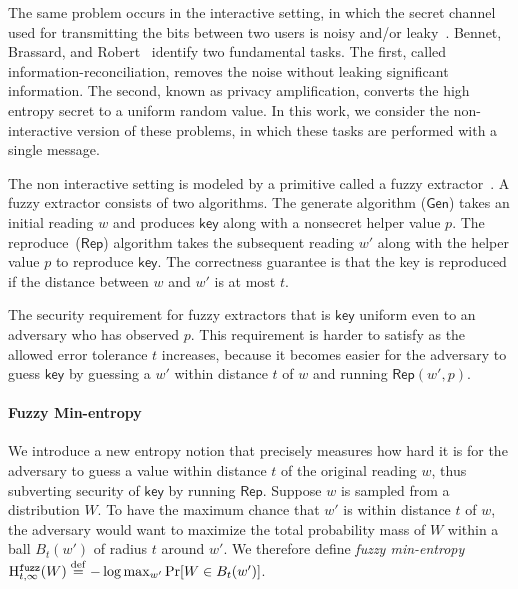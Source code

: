 \documentclass[11pt]{article}
\newcommand{\class}[1]{{\ensuremath{\mathsf{#1}}}}
\newcommand{\key}{\ensuremath{\class{key}}\xspace}
\newcommand{\gen}{\ensuremath{\class{Gen}}\xspace}
\newcommand{\rep}{\ensuremath{\class{Rep}}\xspace}
\newcommand{\eqdef}{\stackrel{\rm def}{=}}
\newcommand{\Hfuzz}{\mathrm{H}^{\mathtt{fuzz}}_{t,\infty}}
\begin{document}
The same problem occurs in the interactive setting, in which the secret channel used for transmitting the bits between two users is noisy and/or leaky~\cite{wyner1975wire}. Bennet, Brassard, and Robert~\cite{bennett1988privacy} identify two fundamental tasks.  The first, called information-reconciliation, removes the noise without leaking significant information. The second, known as privacy amplification, converts the high entropy secret to a uniform random value.  In this work, we consider the non-interactive version of these problems, in which these tasks are performed with a single message.

The non interactive setting is modeled by a primitive called a fuzzy extractor~\cite{DBLP:journals/siamcomp/DodisORS08}.  %
A fuzzy extractor consists of two algorithms. The  generate algorithm ($\gen$)  takes an initial reading $w$ and produces $\key$ along with a nonsecret helper value $p$.  The reproduce~($\rep$) algorithm takes the subsequent reading $w'$ along with the helper value $p$ to reproduce $\key$.   The correctness guarantee is that the key is reproduced if the distance between $w$ and $w'$ is at most $t$. 

The security requirement for fuzzy extractors that is $\key$ uniform even to an adversary who has observed $p$.   This requirement is  harder to satisfy as the allowed error tolerance $t$ increases, because it becomes easier for the adversary to guess $\key$ by guessing a $w'$ within distance $t$ of $w$ and running $\rep(w',p)$.


\paragraph{Fuzzy Min-entropy}
We introduce a new entropy notion that precisely measures how hard it is for the adversary to guess a value within distance $t$ of the original reading $w$, thus subverting security of $\key$ by running $\rep$. Suppose $w$ is sampled from a distribution $W$.   To have the maximum chance that $w'$ is within distance $t$ of $w$, the adversary would want to maximize the total probability mass of $W$ within a ball $B_t(w')$ of radius $t$ around $w'$.
We  therefore define \emph{fuzzy min-entropy} $\Hfuzz(W) \eqdef -\log \max_{w'} \Pr[W\in B_t(w')]$. 
\end{document}
